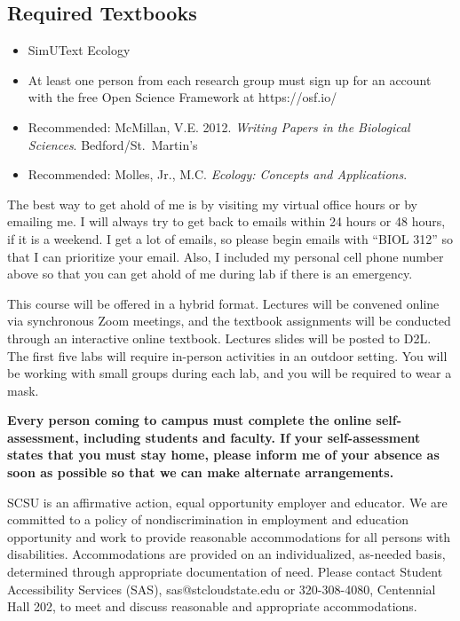 \documentclass{tufte-handout}
\begin{document}
\begin{fullwidth}
\subsection{Required Textbooks}

\begin{itemize}
	\item SimUText Ecology
	\item At least one person from each research group must sign up for an account with the free Open Science Framework at https://osf.io/
	\item Recommended: McMillan, V.E. 2012. \emph{Writing Papers in the Biological Sciences}. Bedford/St.\ Martin's
	\item Recommended: Molles, Jr., M.C. \emph{Ecology: Concepts and Applications}.
\end{itemize}


 The best way to get ahold of me is by visiting my virtual office hours or by emailing me. I will always try to get back to emails within 24 hours or 48 hours, if it is a weekend. I get a lot of emails, so please begin emails with ``BIOL 312'' so that I can prioritize your email. Also, I included my personal cell phone number above so that you can get ahold of me during lab if there is an emergency.

 This course will be offered in a hybrid format. Lectures will be convened online via synchronous Zoom meetings, and the textbook assignments will be conducted through an interactive online textbook. Lectures slides will be posted to D2L. The first five labs will require in-person activities in an outdoor setting. You will be working with small groups during each lab, and you will be required to wear a mask. 

\textbf{Every person coming to campus must complete the online self-assessment, including students and faculty. If your self-assessment states that you must stay home, please inform me of your absence as soon as possible so that we can make alternate arrangements.}



 SCSU is an affirmative action, equal opportunity employer and educator. We are committed to a policy of nondiscrimination in employment and education opportunity and work to provide reasonable accommodations for all persons with disabilities. Accommodations are provided on an individualized, as-needed basis, determined through appropriate documentation of need. Please contact Student Accessibility Services (SAS), sas@stcloudstate.edu or 320-308-4080, Centennial Hall 202, to meet and discuss reasonable and appropriate accommodations. 


\end{fullwidth}
\end{document}
